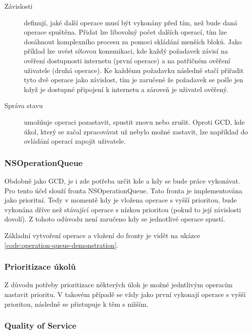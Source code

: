 \begin{description}
  \item[Závislosti] definují, jaké další operace musí být vykonány před tím, než bude daná operace spuštěna.
  Přidat lze libovolný počet dalších operací, tím lze dosáhnout komplexního procesu za pomoci skládání menších bloků.
  Jako příklad lze uvést síťovou komunikaci, kde každý požadavek závisí na ověření dostupnosti internetu (první operace) a na patřičném ověření uživatele (druhá operace).
  Ke každému požadavku následně stačí přiřadit tyto dvě operace jako závislost, tím je zaručené že požadavek se pošle jen když je dostupné připojení k internetu a zároveň je uživatel ověřený.
  \item[Správa stavu] umožňuje operaci pozastavit, spustit znovu nebo zrušit.
  Oproti GCD, kde úkol, který se začal zpracovávat už nebylo možné zastavit, lze například do ovládání operací zapojit uživatele.
\end{description}

\subsubsection*{NSOperationQueue}

Obdobně jako GCD, je i zde potřeba určit kde a kdy se bude práce vykonávat.
Pro tento účel slouží fronta NSOperationQueue.
Tato fronta je implementována jako prioritní.
Tedy v momentě kdy je vložena operace s vyšší prioritou, bude vykonána dříve než stávající operace s nízkou prioritou (pokud to její závislosti dovolí).
Z tohoto odůvodu není zaručeno kdy se jednotlivé operace spustí.

Základní vytvoření operace a vložení do fronty je vidět na ukázce \ref{code:operation-queue-demonstration}.


\subsubsection*{Prioritizace úkolů}

Z důvodu potřeby prioritizace některých úloh je možné jedntlivým operacím nastavit prioritu.
V takovém případě se vždy jako první vykonají operace s vyšší prioritou, následně se přistupuje k těm s nižším.

\subsubsection*{Quality of Service}

